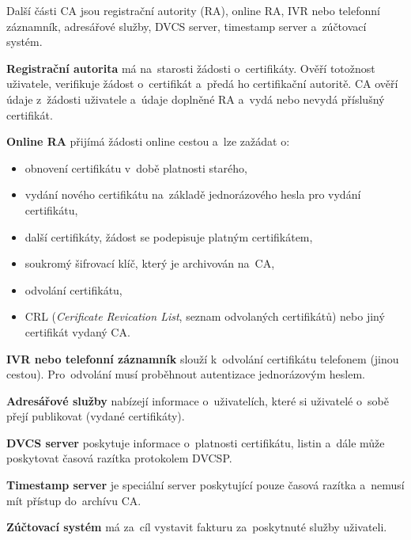 Další části CA jsou registrační autority (RA), online RA, IVR nebo telefonní záznamník, adresářové služby, DVCS server, timestamp server a~zúčtovací systém.

\textbf{Registrační autorita} má na~starosti žádosti o~certifikáty. Ověří totožnost uživatele, verifikuje žádost o~certifikát a~předá ho certifikační autoritě. CA ověří údaje z~žádosti uživatele a~údaje doplněné RA a~vydá nebo nevydá příslušný certifikát.
 
\textbf{Online RA} přijímá žádosti online cestou a~lze zažádat o:
\begin{itemize}
    \item obnovení certifikátu v~době platnosti starého,
    \item vydání nového certifikátu na~základě jednorázového hesla pro vydání~ certifikátu,
    \item další certifikáty, žádost se podepisuje platným certifikátem,
    \item soukromý šifrovací klíč, který je archivován na~CA,
    \item odvolání certifikátu,
    \item CRL (\emph{Cerificate Revication List}, seznam odvolaných certifikátů) nebo jiný certifikát vydaný CA.
\end{itemize}

\textbf{IVR nebo telefonní záznamník} slouží k~odvolání certifikátu telefonem (jinou cestou). Pro~odvolání musí proběhnout autentizace jednorázovým heslem.

\textbf{Adresářové služby} nabízejí informace o~uživatelích, které si uživatelé o~sobě přejí publikovat (vydané certifikáty).

\textbf{DVCS server} poskytuje informace o~platnosti certifikátu, listin a~dále může poskytovat časová razítka protokolem DVCSP.

\textbf{Timestamp server} je speciální server poskytující pouze časová razítka a~nemusí mít přístup do~archívu CA.

\textbf{Zúčtovací systém} má za~cíl vystavit fakturu za~poskytnuté služby uživateli.

